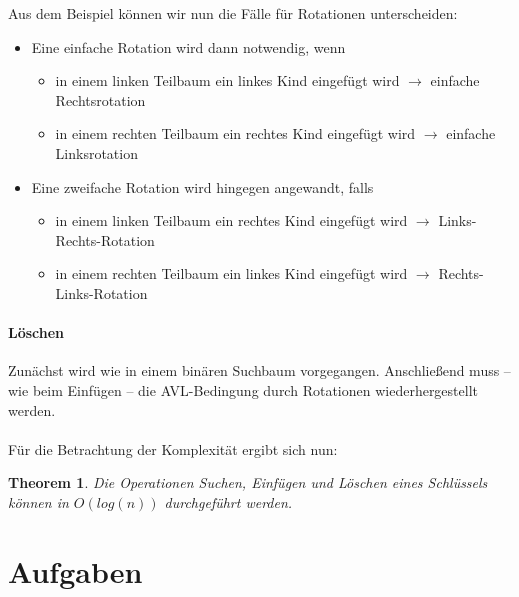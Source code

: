 \documentclass[11pt,a4paper]{scrartcl}
\newtheorem{theorem}{Theorem}
\begin{document}
Aus dem Beispiel können wir nun die Fälle für Rotationen unterscheiden:
\begin{itemize}
\item Eine einfache Rotation wird dann notwendig, wenn
\begin{itemize}
\item in einem linken Teilbaum ein linkes Kind eingefügt wird  $\to$ einfache Rechtsrotation
\item in einem rechten Teilbaum ein rechtes Kind eingefügt wird $\to$ einfache Linksrotation
\end{itemize}
\item Eine zweifache Rotation wird hingegen angewandt, falls
\begin{itemize}
\item in einem linken Teilbaum ein rechtes Kind eingefügt wird $\to$ Links-Rechts-Rotation
\item in einem rechten Teilbaum ein linkes Kind eingefügt wird $\to$ Rechts-Links-Rotation
\end{itemize}
\end{itemize}
\paragraph{Löschen}
Zunächst wird wie in einem binären Suchbaum vorgegangen. Anschließend muss -- wie beim Einfügen -- die AVL-Bedingung durch Rotationen wiederhergestellt werden. \\\\
Für die Betrachtung der Komplexität ergibt sich nun:
\begin{theorem}
Die Operationen Suchen, Einfügen und Löschen eines Schlüssels können in $O(log (n))$ durchgeführt werden.
\end{theorem}
\pagebreak
\section*{Aufgaben}
\end{document}

